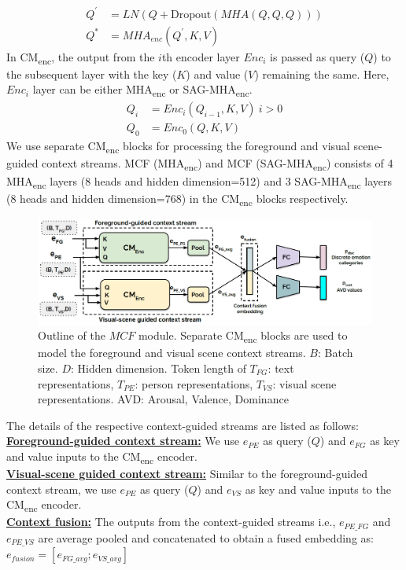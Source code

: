 \begin{equation} \label{SAG-MHAEnc operation}
\begin{split}
 Q^{'} & = LN(Q + \text{Dropout}(MHA(Q,Q,Q))) \\ 
Q^{*} & = MHA_{enc}( Q^{'},K,V) 
\end{split}
\end{equation}
In CM\textsubscript{enc}, the output from the $i$th encoder layer $Enc_{i}$ is passed as query ($Q$) to the subsequent layer with the key ($K$) and value ($V$) remaining the same. Here, $Enc_{i}$ layer can be either MHA\textsubscript{enc} or SAG-MHA\textsubscript{enc}.
\begin{equation} \label{encoder layer operation}
\begin{split}
    Q_{i}&=Enc_{i}(Q_{i-1},K,V) \     i > 0 \\
    Q_{0} &=Enc_{0}(Q,K,V)
\end{split}
\end{equation}
We use separate CM\textsubscript{enc} blocks for processing the foreground and visual scene-guided context streams. MCF (MHA\textsubscript{enc}) and MCF (SAG-MHA\textsubscript{enc}) consists of 4 MHA\textsubscript{enc} layers (8 heads and hidden dimension=512) and 3 SAG-MHA\textsubscript{enc} layers (8 heads and hidden dimension=768) in the CM\textsubscript{enc} blocks respectively.

\begin{figure}[h!]
    \centering
    \includegraphics[width=\columnwidth]{figures/MCF_module_updated.png}
    \caption{Outline of the $MCF$ module. Separate CM\textsubscript{enc} blocks are used to model the foreground and visual scene context streams. $B$: Batch size. $D$: Hidden dimension. Token length of $T_{FG}$: text representations, $T_{PE}$: person representations, $T_{VS}$: visual scene representations. AVD: Arousal, Valence, Dominance
    }
    \label{mcf module}
\end{figure}
The details of the respective context-guided streams are listed as follows:\\
\textbf{\underline{Foreground-guided context stream:}} We use $e_{PE}$ as query ($Q$) and $e_{FG}$ as key and value inputs to the CM\textsubscript{enc} encoder.\\
\textbf{\underline{Visual-scene guided context stream:}} Similar to the foreground-guided context stream, we use $e_{PE}$ as query ($Q$) and $e_{VS}$ as key and value inputs to the CM\textsubscript{enc} encoder.\\
\textbf{\underline{Context fusion:}}
The outputs from the context-guided streams i.e., $e_{PE\_{FG}}$ and $e_{PE\_{VS}}$ are average pooled and concatenated to obtain a fused embedding as: $e_{fusion}=[e_{FG\_{avg}};e_{VS\_{avg}}]$
